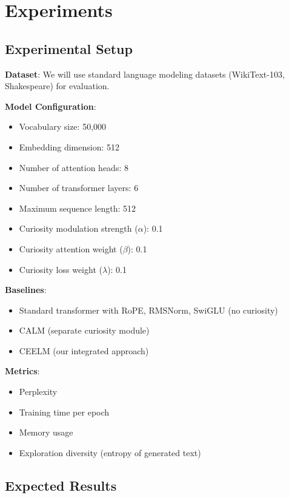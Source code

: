 \documentclass{IEEEtran}
\begin{document}
\section{Experiments}

\subsection{Experimental Setup}

\textbf{Dataset}: We will use standard language modeling datasets (WikiText-103, Shakespeare) for evaluation.

\textbf{Model Configuration}:
\begin{itemize}
    \item Vocabulary size: 50,000
    \item Embedding dimension: 512
    \item Number of attention heads: 8
    \item Number of transformer layers: 6
    \item Maximum sequence length: 512
    \item Curiosity modulation strength ($\alpha$): 0.1
    \item Curiosity attention weight ($\beta$): 0.1
    \item Curiosity loss weight ($\lambda$): 0.1
\end{itemize}

\textbf{Baselines}:
\begin{itemize}
    \item Standard transformer with RoPE, RMSNorm, SwiGLU (no curiosity)
    \item CALM (separate curiosity module)
    \item CEELM (our integrated approach)
\end{itemize}

\textbf{Metrics}:
\begin{itemize}
    \item Perplexity
    \item Training time per epoch
    \item Memory usage
    \item Exploration diversity (entropy of generated text)
\end{itemize}

\subsection{Expected Results}
\end{document}
